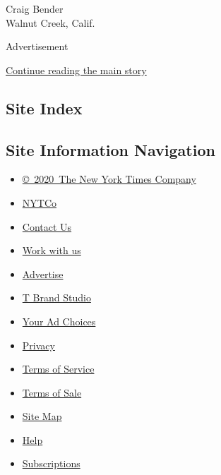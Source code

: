 Craig Bender\\
Walnut Creek, Calif.

Advertisement

\protect\hyperlink{after-bottom}{Continue reading the main story}

\hypertarget{site-index}{%
\subsection{Site Index}\label{site-index}}

\hypertarget{site-information-navigation}{%
\subsection{Site Information
Navigation}\label{site-information-navigation}}

\begin{itemize}
\tightlist
\item
  \href{https://help.nytimes3xbfgragh.onion/hc/en-us/articles/115014792127-Copyright-notice}{©~2020~The
  New York Times Company}
\end{itemize}

\begin{itemize}
\tightlist
\item
  \href{https://www.nytco.com/}{NYTCo}
\item
  \href{https://help.nytimes3xbfgragh.onion/hc/en-us/articles/115015385887-Contact-Us}{Contact
  Us}
\item
  \href{https://www.nytco.com/careers/}{Work with us}
\item
  \href{https://nytmediakit.com/}{Advertise}
\item
  \href{http://www.tbrandstudio.com/}{T Brand Studio}
\item
  \href{https://www.nytimes3xbfgragh.onion/privacy/cookie-policy\#how-do-i-manage-trackers}{Your
  Ad Choices}
\item
  \href{https://www.nytimes3xbfgragh.onion/privacy}{Privacy}
\item
  \href{https://help.nytimes3xbfgragh.onion/hc/en-us/articles/115014893428-Terms-of-service}{Terms
  of Service}
\item
  \href{https://help.nytimes3xbfgragh.onion/hc/en-us/articles/115014893968-Terms-of-sale}{Terms
  of Sale}
\item
  \href{https://spiderbites.nytimes3xbfgragh.onion}{Site Map}
\item
  \href{https://help.nytimes3xbfgragh.onion/hc/en-us}{Help}
\item
  \href{https://www.nytimes3xbfgragh.onion/subscription?campaignId=37WXW}{Subscriptions}
\end{itemize}
